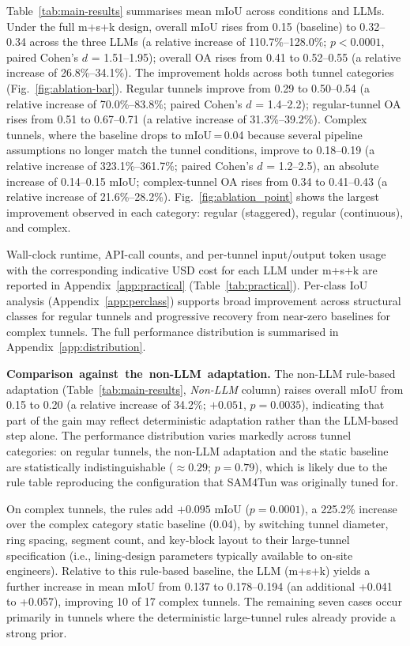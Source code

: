 \documentclass[a4paper,fleqn]{cas-dc}
\begin{document}
{Table~\ref{tab:main-results} summarises mean mIoU across conditions and LLMs. Under the full m+s+k design, overall mIoU rises from 0.15 (baseline) to 0.32--0.34 across the three LLMs (a relative increase of 110.7\%--128.0\%; $p < 0.0001$, paired Cohen's \mbox{$d$} = 1.51--1.95); overall OA rises from 0.41 to 0.52--0.55 (a relative increase of 26.8\%--34.1\%). The improvement holds across both tunnel categories (Fig.~\ref{fig:ablation-bar}). Regular tunnels improve from 0.29 to 0.50--0.54 (a relative increase of 70.0\%--83.8\%; paired Cohen's \mbox{$d$} = 1.4--2.2); regular-tunnel OA rises from 0.51 to 0.67--0.71 (a relative increase of 31.3\%--39.2\%). Complex tunnels, where the baseline drops to mIoU\,=\,0.04 because several pipeline assumptions no longer match the tunnel conditions, improve to 0.18--0.19 (a relative increase of 323.1\%--361.7\%; paired Cohen's \mbox{$d$} = 1.2--2.5), an absolute increase of 0.14--0.15 mIoU; complex-tunnel OA rises from 0.34 to 0.41--0.43 (a relative increase of 21.6\%--28.2\%). Fig.~\ref{fig:ablation_point} shows the largest improvement observed in each category: regular (staggered), regular (continuous), and complex.

Wall-clock runtime, API-call counts, and per-tunnel input/output token usage with the corresponding indicative USD cost for each LLM under m+s+k are reported in Appendix~\ref{app:practical} (Table~\ref{tab:practical}). Per-class IoU analysis (Appendix~\ref{app:perclass}) supports broad improvement across structural classes for regular tunnels and progressive recovery from near-zero baselines for complex tunnels. The full performance distribution is summarised in Appendix~\ref{app:distribution}. 



\mbox{\textbf{Comparison against the non-LLM adaptation.}} The non-LLM rule-based adaptation (Table~\mbox{\ref{tab:main-results}}, \mbox{\emph{Non-LLM}} column) raises overall mIoU from 0.15 to 0.20 (a relative increase of 34.2\%; $+0.051$, $p = 0.0035$), indicating that part of the gain may reflect deterministic adaptation rather than the LLM-based step alone. The performance distribution varies markedly across tunnel categories: on regular tunnels, the non-LLM adaptation and the static baseline are statistically indistinguishable ($\approx 0.29$; $p = 0.79$), which is likely due to the rule table reproducing the configuration that SAM4Tun was originally tuned for.

On complex tunnels, the rules add $+0.095$ mIoU ($p = 0.0001$), a 225.2\% increase over the complex category static baseline (0.04), by switching tunnel diameter, ring spacing, segment count, and key-block layout to their large-tunnel specification (i.e., lining-design parameters typically available to on-site engineers). Relative to this rule-based baseline, the LLM (m+s+k) yields a further increase in mean mIoU from 0.137 to 0.178--0.194 (an additional +0.041 to +0.057), improving 10 of 17 complex tunnels. The remaining seven cases occur primarily in tunnels where the deterministic large-tunnel rules already provide a strong prior.

}
\end{document}
